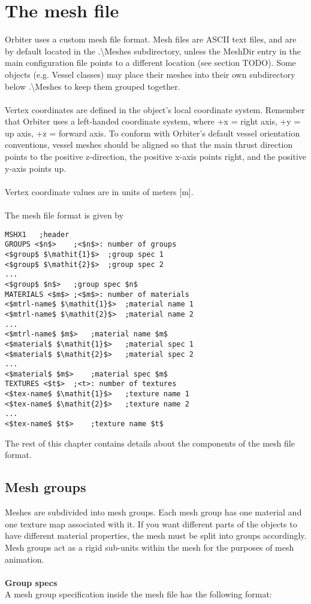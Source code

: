 \documentclass[Orbiter Developer Manual.tex]{subfiles}
\begin{document}
\section{The mesh file}
\label{sec:mesh_file}
Orbiter uses a custom mesh file format. Mesh files are ASCII text files, and are by default located in the .\textbackslash Meshes subdirectory, unless the MeshDir entry in the main configuration file points to a different location (see section TODO). Some objects (e.g. Vessel classes) may place their meshes into their own subdirectory below .\textbackslash Meshes to keep them grouped together.\\
\\
Vertex coordinates are defined in the object’s local coordinate system. Remember that Orbiter uses a left-handed coordinate system, where +x = right axis, +y = up axis, +z = forward axis. To conform with Orbiter’s default vessel orientation conventions, vessel meshes should be aligned so that the main thrust direction points to the positive z-direction, the positive x-axis points right, and the positive y-axis points up.\\
\\
Vertex coordinate values are in units of meters [m].\\
\\
The mesh file format is given by

\begin{lstlisting}[language=OSFS,mathescape=true]
MSHX1	;header
GROUPS <$n$>	;<$n$>: number of groups
<$group$ $\mathit{1}$>	;group spec 1
<$group$ $\mathit{2}$>	;group spec 2
...
<$group$ $n$>	;group spec $n$
MATERIALS <$m$>	;<$m$>: number of materials
<$mtrl-name$ $\mathit{1}$>	;material name 1
<$mtrl-name$ $\mathit{2}$>	;material name 2
...
<$mtrl-name$ $m$>	;material name $m$
<$material$ $\mathit{1}$>	;material spec 1
<$material$ $\mathit{2}$>	;material spec 2
...
<$material$ $m$>	;material spec $m$
TEXTURES <$t$>	;<t>: number of textures
<$tex-name$ $\mathit{1}$>	;texture name 1
<$tex-name$ $\mathit{2}$>	;texture name 2
...
<$tex-name$ $t$>	;texture name $t$
\end{lstlisting}

\noindent
The rest of this chapter contains details about the components of the mesh file format.


\subsection{Mesh groups}
Meshes are subdivided into mesh groups. Each mesh group has one material and one texture map associated with it. If you want different parts of the objects to have different material properties, the mesh must be split into groups accordingly. Mesh groups act as a rigid sub-units within the mesh for the purposes of mesh animation.\\
\\
\textbf{Group specs}\\
A mesh group specification inside the mesh file has the following format:
\end{document}
